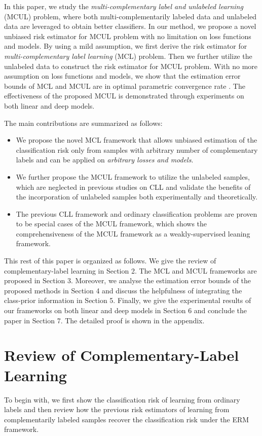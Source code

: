 \documentclass[]{article} \usepackage{geometry}
\begin{document}
In this paper, we study the \textit{multi-complementary label and unlabeled learning} (MCUL) problem, where both multi-complementarily labeled data and unlabeled data are leveraged to obtain better classifiers. In our method, we propose a novel unbiased risk estimator for MCUL problem with no limitation on loss functions and models. By using a mild assumption, we first derive the risk estimator for \textit{multi-complementary label learning} (MCL) problem. Then we further utilize the unlabeled data to construct the risk estimator for MCUL problem. With no more assumption on loss functions and models, we show that the estimation error bounds of MCL and MCUL are in optimal parametric convergence rate \cite{vapnik}. The effectiveness of the proposed MCUL is demonstrated through experiments on both linear and deep models.

The main contributions are summarized as follows:
\begin{itemize}
\item We propose the novel MCL framework that allows unbiased estimation of the classification risk only from samples with arbitrary number of complementary labels and can be applied on \textit{arbitrary losses and models}.

\item We further propose the MCUL framework to utilize the unlabeled samples, which are neglected in previous studies on CLL\cite{DBLP:conf/nips/IshidaNHS17,DBLP:conf/eccv/YuLGT18,DBLP:conf/icml/IshidaNMS19} and validate the benefits of the incorporation of unlabeled samples both experimentally and theoretically.

\item The previous CLL framework and ordinary classification problems are proven to be special cases of the MCUL framework, which  shows the comprehensiveness of the MCUL framework as a weakly-supervised leaning framework.
\end{itemize}

This rest of this paper is organized as follows. We give the review of complementary-label learning in Section 2. The MCL and MCUL frameworks are proposed in Section 3. Moreover, we analyse the estimation error bounds of the proposed methods in Section 4 and discuss the helpfulness of integrating the class-prior information in Section 5. Finally, we give the experimental results of our frameworks on both linear and deep models in Section 6 and conclude the paper in Section 7. The detailed proof is shown in the appendix.
\section{Review of Complementary-Label Learning}
To begin with, we first show the classification risk of learning from ordinary labels and then review how the previous risk estimators of learning from complementarily labeled samples recover the classification risk under the ERM framework.
\end{document}
